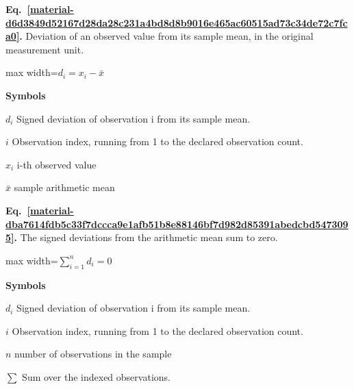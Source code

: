 \documentclass[11pt,a4paper]{article}
\begin{document}
\par\medskip
\begin{samepage}
\label{material-d6d3849d52167d28da28c231a4bd8d8b9016e465ac60515ad73c34de72c7fca0}
\noindent\textbf{Eq.~\ref*{material-d6d3849d52167d28da28c231a4bd8d8b9016e465ac60515ad73c34de72c7fca0}.} Deviation of an observed value from its sample mean, in the original measurement unit.\par\nopagebreak
\begin{center}\begin{adjustbox}{max width=\linewidth}$\displaystyle d_i=x_i-\bar{x}$\end{adjustbox}\end{center}

\par\noindent\textbf{Symbols}

\par\noindent\textbf{\(d_i\)} Signed deviation of observation i from its sample mean.

\par\noindent\textbf{\(i\)} Observation index, running from 1 to the declared observation count.

\par\noindent\textbf{\(x_i\)} i-th observed value

\par\noindent\textbf{\(\bar{x}\)} sample arithmetic mean

\end{samepage}
\medskip

\par\medskip
\begin{samepage}
\label{material-dba7614fdb5c33f7dccca9e1afb51b8e88146bf7d982d85391abedcbd5473095}
\noindent\textbf{Eq.~\ref*{material-dba7614fdb5c33f7dccca9e1afb51b8e88146bf7d982d85391abedcbd5473095}.} The signed deviations from the arithmetic mean sum to zero.\par\nopagebreak
\begin{center}\begin{adjustbox}{max width=\linewidth}$\displaystyle \sum_{i=1}^n d_i=0$\end{adjustbox}\end{center}

\par\noindent\textbf{Symbols}

\par\noindent\textbf{\(d_i\)} Signed deviation of observation i from its sample mean.

\par\noindent\textbf{\(i\)} Observation index, running from 1 to the declared observation count.

\par\noindent\textbf{\(n\)} number of observations in the sample

\par\noindent\textbf{\(\sum\)} Sum over the indexed observations.

\end{samepage}
\medskip
\end{document}
